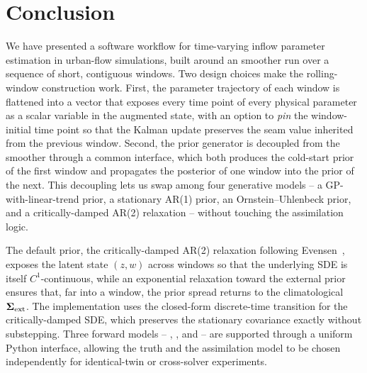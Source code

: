 \section{Conclusion}
\label{sec:conclusion}

We have presented a software workflow for time-varying inflow
parameter estimation in urban-flow simulations, built around an
\ESMDA{} smoother run over a sequence of short, contiguous windows.
Two design choices make the rolling-window construction work.
First, the parameter trajectory of each window is flattened into a
vector that exposes every time point of every physical parameter as
a scalar variable in the augmented state, with an option to
\emph{pin} the window-initial time point so that the Kalman update
preserves the seam value inherited from the previous window.
Second, the prior generator is decoupled from the smoother through
a common \paramTSclass{} interface, which both produces
the cold-start prior of the first window and propagates the
posterior of one window into the prior of the next.  This
decoupling lets us swap among four generative models -- a
GP-with-linear-trend prior, a stationary AR(1) prior, an
Ornstein--Uhlenbeck prior, and a critically-damped AR(2) relaxation
-- without touching the assimilation logic.

The default prior, the critically-damped AR(2) relaxation following
Evensen~\cite{evensen2024}, exposes the latent state $(z, w)$
across windows so that the underlying SDE is itself $C^1$-continuous,
while an exponential relaxation toward the external prior ensures
that, far into a window, the prior spread returns to the
climatological $\boldsymbol{\Sigma}_{\mathrm{ext}}$.  The implementation uses the closed-form
discrete-time transition for the critically-damped SDE, which
preserves the stationary covariance exactly without substepping.
Three forward models -- \pylbm{}, \pyudales{}, and \pypalm{} --
are supported through a uniform Python interface, allowing the
truth and the assimilation model to be chosen independently for
identical-twin or cross-solver experiments.

